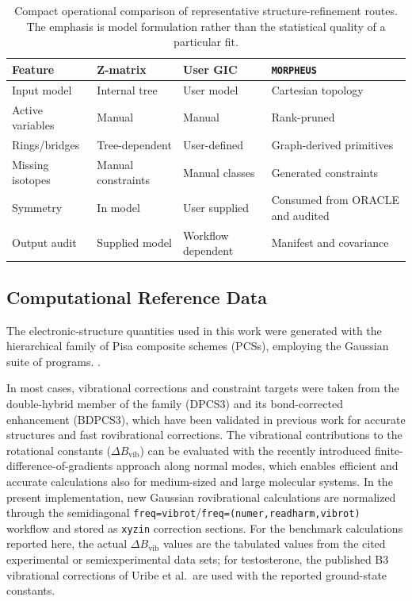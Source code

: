 \documentclass[aip,jcp,reprint,longbibliography,floatfix]{revtex4-2}
\begin{document}
\begin{table}
\caption{Compact operational comparison of representative
structure-refinement routes. The emphasis is model formulation rather than the
statistical quality of a particular fit.}
\label{tab:workflow-comparison}
\footnotesize
\setlength{\tabcolsep}{5pt}
\begin{tabular}{@{}llll@{}}
\toprule
Feature & Z-matrix & User GIC & \texttt{MORPHEUS} \\
\midrule
Input model & Internal tree & User model & Cartesian topology \\
Active variables & Manual & Manual & Rank-pruned \\
Rings/bridges & Tree-dependent & User-defined & Graph-derived primitives \\
Missing isotopes & Manual constraints & Manual classes & Generated constraints \\
Symmetry & In model & User supplied & Consumed from ORACLE and audited \\
Output audit & Supplied model & Workflow dependent & Manifest and covariance \\
\bottomrule
\end{tabular}
\end{table}


\subsection{Computational Reference Data}

The electronic-structure quantities used in this work were generated with the
hierarchical family of Pisa composite schemes (PCSs),\cite{pcs1234_2024,Lazzari2025LCB25} employing the Gaussian suite of programs.
\cite{g16}.

In most cases, vibrational corrections and constraint targets were taken from the
double-hybrid member of the family (DPCS3) and its bond-corrected enhancement (BDPCS3),
which have been validated in previous work for accurate structures and fast rovibrational corrections.\cite{wires_2025,Mendolicchio2025FastDvib,acr_2026}
The vibrational contributions to the rotational constants
($\Delta B_\mathrm{vib}$) can be evaluated with the recently introduced
finite-difference-of-gradients approach along normal modes, which enables
efficient and accurate calculations also for medium-sized and large molecular
systems.\cite{Mendolicchio2025FastDvib} In the present implementation,
new Gaussian rovibrational calculations are normalized through the
semidiagonal \texttt{freq=vibrot}/\texttt{freq=(numer,readharm,vibrot)}
workflow and stored as \texttt{xyzin} correction sections. For the benchmark
calculations reported here, the actual $\Delta B_\mathrm{vib}$ values are the
tabulated values from the cited experimental or semiexperimental data sets;
for testosterone, the published B3 vibrational corrections of
Uribe et al.\ are used with the reported ground-state constants.
\end{document}
